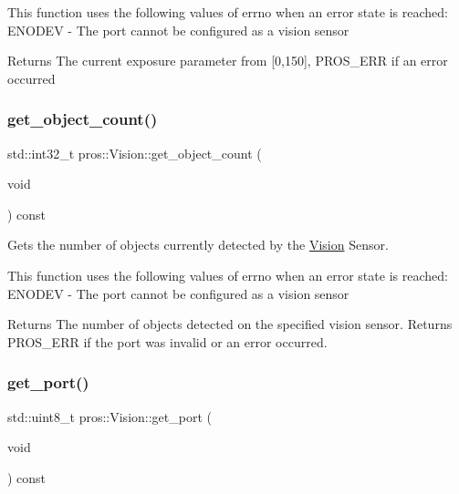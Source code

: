 This function uses the following values of errno when an error state is reached\+: E\+N\+O\+D\+EV -\/ The port cannot be configured as a vision sensor

\begin{DoxyReturn}{Returns}
The current exposure parameter from \mbox{[}0,150\mbox{]}, P\+R\+O\+S\+\_\+\+E\+RR if an error occurred 
\end{DoxyReturn}
\mbox{\label{classpros_1_1Vision_a73869f85b3d2e468ffc51957d80f5a75}} 
\subsubsection{\texorpdfstring{get\+\_\+object\+\_\+count()}{get\_object\_count()}}
{\footnotesize\ttfamily std\+::int32\+\_\+t pros\+::\+Vision\+::get\+\_\+object\+\_\+count (\begin{DoxyParamCaption}\item[{void}]{ }\end{DoxyParamCaption}) const}

Gets the number of objects currently detected by the \hyperlink{classpros_1_1Vision}{Vision} Sensor.

This function uses the following values of errno when an error state is reached\+: E\+N\+O\+D\+EV -\/ The port cannot be configured as a vision sensor

\begin{DoxyReturn}{Returns}
The number of objects detected on the specified vision sensor. Returns P\+R\+O\+S\+\_\+\+E\+RR if the port was invalid or an error occurred. 
\end{DoxyReturn}
\mbox{\label{classpros_1_1Vision_af9958688590139df7b1227765f63d5ce}} 
\subsubsection{\texorpdfstring{get\+\_\+port()}{get\_port()}}
{\footnotesize\ttfamily std\+::uint8\+\_\+t pros\+::\+Vision\+::get\+\_\+port (\begin{DoxyParamCaption}\item[{void}]{ }\end{DoxyParamCaption}) const}

